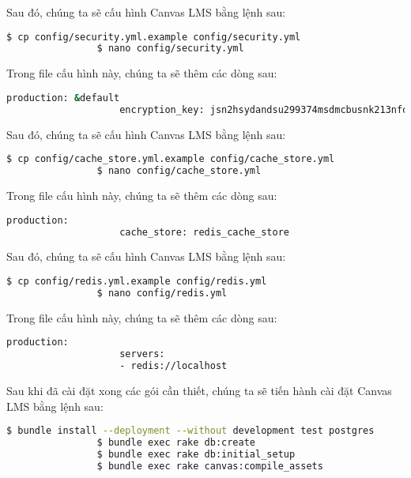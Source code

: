 \documentclass[../Thesis.tex]{subfiles}
\begin{document}
\begin{enumerate}
            Sau đó, chúng ta sẽ cấu hình Canvas LMS bằng lệnh sau:
            \begin{lstlisting}[language=bash]
                $ cp config/security.yml.example config/security.yml
                $ nano config/security.yml
            \end{lstlisting}

            Trong file cấu hình này, chúng ta sẽ thêm các dòng sau:
            \begin{lstlisting}[language=bash]
                production: &default
                    encryption_key: jsn2hsydandsu299374msdmcbusnk213nfdu2
            \end{lstlisting}

            Sau đó, chúng ta sẽ cấu hình Canvas LMS bằng lệnh sau:
            \begin{lstlisting}[language=bash]
                $ cp config/cache_store.yml.example config/cache_store.yml
                $ nano config/cache_store.yml
            \end{lstlisting}

            Trong file cấu hình này, chúng ta sẽ thêm các dòng sau:
            \begin{lstlisting}[language=bash]
                production:
                    cache_store: redis_cache_store
            \end{lstlisting}

            Sau đó, chúng ta sẽ cấu hình Canvas LMS bằng lệnh sau:
            \begin{lstlisting}[language=bash]
                $ cp config/redis.yml.example config/redis.yml
                $ nano config/redis.yml
            \end{lstlisting}

            Trong file cấu hình này, chúng ta sẽ thêm các dòng sau:
            \begin{lstlisting}[language=bash]
                production:
                    servers:
                    - redis://localhost
            \end{lstlisting}

            Sau khi đã cài đặt xong các gói cần thiết, chúng ta sẽ tiến hành cài đặt Canvas LMS bằng lệnh sau:
            \begin{lstlisting}[language=bash]
                $ bundle install --deployment --without development test postgres
                $ bundle exec rake db:create
                $ bundle exec rake db:initial_setup
                $ bundle exec rake canvas:compile_assets
            \end{lstlisting}


\end{enumerate}
\end{document}
